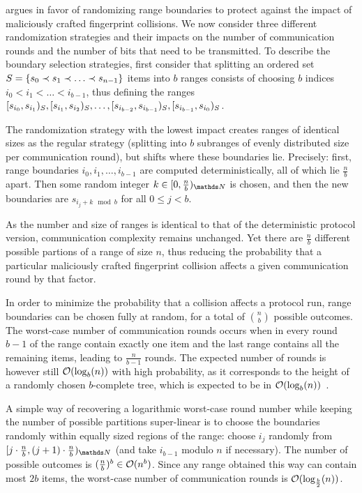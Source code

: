  argues in favor of randomizing range boundaries to protect against the impact of maliciously crafted fingerprint collisions. We now consider three different randomization strategies and their impacts on the number of communication rounds and the number of bits that need to be transmitted. To describe the boundary selection strategies, first consider that splitting an ordered set $S = \{s_0 \prec s_1 \prec \ldots \prec s_{n - 1}\}$ items into $b$ ranges consists of choosing $b$ indices $i_0 < i_1 < \ldots < i_{b-1}$, thus defining the ranges $[{s_{i_0}},{s_{i_1}})_{S}, [{s_{i_1}},{s_{i_2}})_{S}, \ldots, [{s_{i_{b - 2}}},{s_{i_{b - 1}}})_{S}, [{s_{i_{b - 1}}},{s_{i_0}})_{S}$.

The randomization strategy with the lowest impact creates ranges of identical sizes as the regular strategy (splitting into $b$ subranges of evenly distributed size per communication round), but shifts where these boundaries lie. Precisely: first, range boundaries $i_0, i_1, \ldots, i_{b - 1}$ are computed deterministically, all of which lie $\frac{n}{b}$ apart. Then some random integer $k \in \range{0}{\frac{n}{b}}{\N}$ is chosen, and then the new boundaries are $s_{i_j + k \mod b}$ for all $0 \leq j < b$.

 As the number and size of ranges is identical to that of the deterministic protocol version, communication complexity remains unchanged. Yet there are $\frac{n}{b}$ different possible partions of a range of size $n$, thus reducing the probability that a particular maliciously crafted fingerprint collision affects a given communication round by that factor.

In order to minimize the probability that a collision affects a protocol run, range boundaries can be chosen fully at random, for a total of $\binom{n}{b}$ possible outcomes. The worst-case number of communication rounds occurs when in every round $b-1$ of the range contain exactly one item and the last range contains all the remaining items, leading to $\frac{n}{b - 1}$ rounds. The expected number of rounds is however still $\mathcal{O}(\log_b(n))$ with high probability, as it corresponds to the height of a randomly chosen $b$-complete tree, which is expected to be in $\mathcal{O}(\log_b(n))$~\cite{devroye1990height}.

A simple way of recovering a logarithmic worst-case round number while keeping the number of possible partitions super-linear is to choose the boundaries randomly within equally sized regions of the range: choose $i_j$ randomly from $\range{j \cdot \frac{n}{b}}{(j + 1) \cdot \frac{n}{b}}{\N}$ (and take $i_{b - 1}$ modulo $n$ if necessary). The number of possible outcomes is $(\frac{n}{b})^b \in \mathcal{O}(n^b)$. Since any range obtained this way can contain most $2b$ items, the worst-case number of communication rounds is $\mathcal{O}(\log_{\frac{b}{2}}(n))$.

